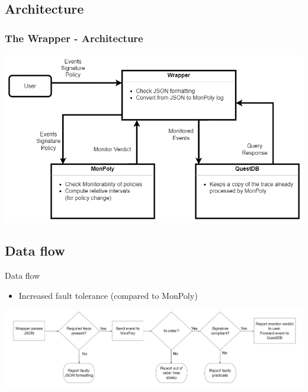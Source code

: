 \subsection{Architecture}


\begin{frame}
    \frametitle{The Wrapper - Architecture}
    \centering
    \includegraphics[width=\linewidth]{diagrams/wrapper.png}
\end{frame}

\subsection{Data flow}

\begin{frame}{Data flow}
    \begin{itemize}
        \item Increased fault tolerance (compared to MonPoly)
    \end{itemize}
    \vspace{1cm}
    \includegraphics[width=1.0\linewidth]{diagrams/flowchart-2.png}
\end{frame}
